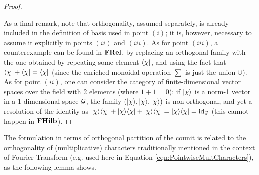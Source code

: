 \begin{proof}
\begin{itemize}
\end{itemize}

As a final remark, note that orthogonality, assumed separately, is already included in the definition of basis used in point $(i)$; it is, however, necessary to assume it explicitly in points $(ii)$ and $(iii)$. As for point $(iii)$, a counterexample can be found in $\mathbf{FRel}$, by replacing an orthogonal family with the one obtained by repeating some element $\langle \chi |$, and using the fact that $\langle \chi | + \langle \chi | = \langle \chi |$ (since the enriched monoidal operation $\sum$ is just the union $\cup$). As for point $(ii)$, one can consider the category of finite-dimensional vector spaces over the field with 2 elements (where $1+1=0$): if $| \chi \rangle$ is a norm-1 vector in a 1-dimensional space $\mathcal{G}$, the family $(| \chi \rangle,| \chi \rangle,| \chi \rangle)$ is non-orthogonal, and yet a resolution of the identity as $| \chi \rangle\langle \chi |+| \chi \rangle\langle \chi |+| \chi \rangle\langle \chi | = | \chi \rangle\langle \chi | = \mbox{id}_{\mathcal{G}}$ (this cannot happen in $\mathbf{FHilb}$).
\end{proof}

The formulation in terms of orthogonal partition of the counit is related to the orthogonality of (multiplicative) characters traditionally mentioned in the context of Fourier Transform (e.g. used here in Equation \ref{eqn:PointwiseMultCharacters}), as the following lemma shows. 

